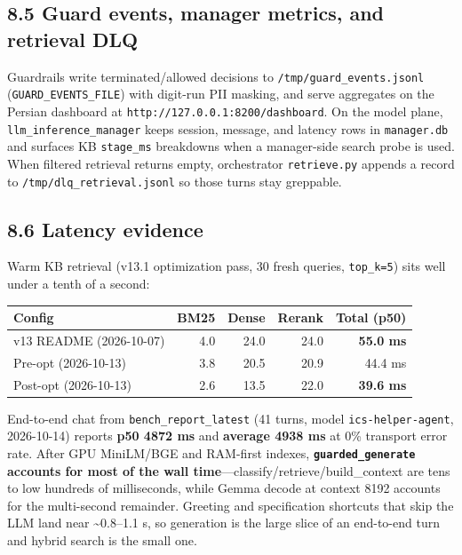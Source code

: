 \subsection{8.5 Guard events, manager metrics, and retrieval DLQ}\label{guard-events-manager-metrics-and-retrieval-dlq}

Guardrails write terminated/allowed decisions to \texttt{/tmp/guard\_events.jsonl} (\texttt{GUARD\_EVENTS\_FILE}) with digit-run PII masking, and serve aggregates on the Persian dashboard at \texttt{http://127.0.0.1:8200/dashboard}. On the model plane, \texttt{llm\_inference\_manager} keeps session, message, and latency rows in \texttt{manager.db} and surfaces KB \texttt{stage\_ms} breakdowns when a manager-side search probe is used. When filtered retrieval returns empty, orchestrator \texttt{retrieve.py} appends a record to \texttt{/tmp/dlq\_retrieval.jsonl} so those turns stay greppable.

\subsection{8.6 Latency evidence}\label{latency-evidence}

Warm KB retrieval (v13.1 optimization pass, 30 fresh queries, \texttt{top\_k=5}) sits well under a tenth of a second:

\begin{longtable}[]{@{}lrrrr@{}}
\toprule\noalign{}
Config & BM25 & Dense & Rerank & Total (p50) \\
\midrule\noalign{}
\endhead
\bottomrule\noalign{}
\endlastfoot
v13 README (2026-10-07) & 4.0 & 24.0 & 24.0 & \textbf{55.0 ms} \\
Pre-opt (2026-10-13) & 3.8 & 20.5 & 20.9 & 44.4 ms \\
Post-opt (2026-10-13) & 2.6 & 13.5 & 22.0 & \textbf{39.6 ms} \\
\end{longtable}

End-to-end chat from \texttt{bench\_report\_latest} (41 turns, model \texttt{ics-helper-agent}, 2026-10-14) reports \textbf{p50 4872 ms} and \textbf{average 4938 ms} at 0\% transport error rate. After GPU MiniLM/BGE and RAM-first indexes, \textbf{\texttt{guarded\_generate} accounts for most of the wall time}---classify/retrieve/build\_context are tens to low hundreds of milliseconds, while Gemma decode at context 8192 accounts for the multi-second remainder. Greeting and specification shortcuts that skip the LLM land near \textasciitilde0.8--1.1 s, so generation is the large slice of an end-to-end turn and hybrid search is the small one.

